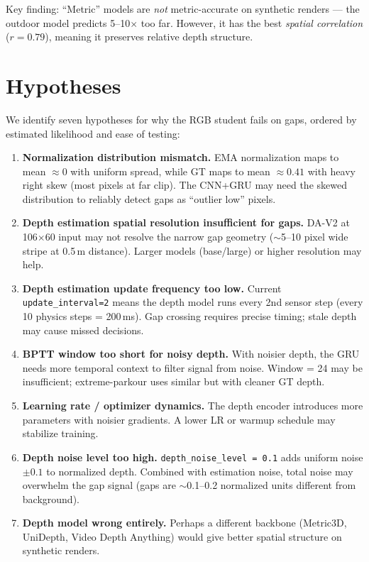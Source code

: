 \documentclass[11pt,a4paper]{article}
\begin{document}
Key finding: ``Metric'' models are \emph{not} metric-accurate on synthetic
renders --- the outdoor model predicts 5--10$\times$ too far.  However, it
has the best \emph{spatial correlation} ($r = 0.79$), meaning it preserves
relative depth structure.

\section{Hypotheses}

We identify seven hypotheses for why the RGB student fails on gaps, ordered
by estimated likelihood and ease of testing:

\begin{enumerate}[label=\textbf{H\arabic*}]
  \item \textbf{Normalization distribution mismatch.}
        EMA normalization maps to mean $\approx 0$ with uniform spread, while
        GT maps to mean $\approx 0.41$ with heavy right skew (most pixels at
        far clip).  The CNN+GRU may need the skewed distribution to reliably
        detect gaps as ``outlier low'' pixels.

  \item \textbf{Depth estimation spatial resolution insufficient for gaps.}
        DA-V2 at 106$\times$60 input may not resolve the narrow gap geometry
        ($\sim$5--10 pixel wide stripe at 0.5\,m distance).  Larger models
        (base/large) or higher resolution may help.

  \item \textbf{Depth estimation update frequency too low.}
        Current \texttt{update\_interval=2} means the depth model runs every
        2nd sensor step (every 10 physics steps = 200\,ms).  Gap crossing
        requires precise timing; stale depth may cause missed decisions.

  \item \textbf{BPTT window too short for noisy depth.}
        With noisier depth, the GRU needs more temporal context to filter
        signal from noise.  Window = 24 may be insufficient; extreme-parkour
        uses similar but with cleaner GT depth.

  \item \textbf{Learning rate / optimizer dynamics.}
        The depth encoder introduces more parameters with noisier gradients.
        A lower LR or warmup schedule may stabilize training.

  \item \textbf{Depth noise level too high.}
        \texttt{depth\_noise\_level = 0.1} adds uniform noise $\pm 0.1$ to
        normalized depth.  Combined with estimation noise, total noise may
        overwhelm the gap signal (gaps are $\sim$0.1--0.2 normalized units
        different from background).

  \item \textbf{Depth model wrong entirely.}
        Perhaps a different backbone (Metric3D, UniDepth, Video Depth
        Anything) would give better spatial structure on synthetic renders.
\end{enumerate}
\end{document}
